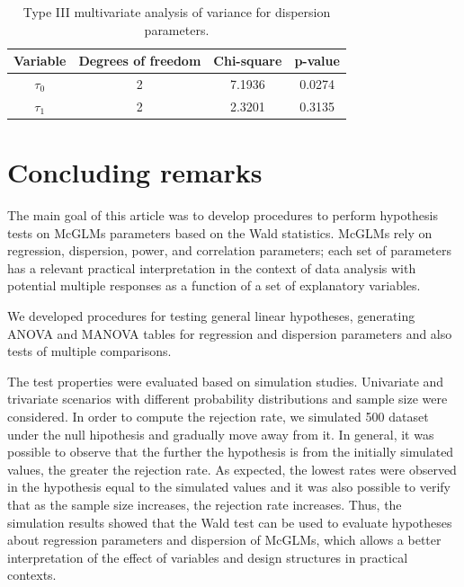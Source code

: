 \documentclass[Review,sagev,times, doublespace]{sagej}
\begin{document}
\begin{table}[h]
\centering
\begin{tabular}{cccc}
\hline
Variable               & Degrees of freedom & Chi-square & p-value        \\ \hline
$\tau_0$ & 2                  & 7.1936       & 0.0274  \\
$\tau_1$ & 2                  & 2.3201       & 0.3135         \\ \hline
\end{tabular}
\caption{Type III multivariate analysis of variance for dispersion parameters.}
\label{tab8}
\end{table}


\section{Concluding remarks}\label{sec7}

The main goal of this article was to develop procedures to perform hypothesis tests on McGLMs parameters based on the Wald statistics. McGLMs rely on regression, dispersion, power, and correlation parameters; each set of parameters has a relevant practical interpretation in the context of data analysis with potential multiple responses as a function of a set of explanatory variables.

We developed procedures for testing general linear hypotheses, generating ANOVA and MANOVA tables for regression and dispersion parameters and also tests of multiple comparisons.

The test properties were evaluated based on simulation studies. Univariate and trivariate scenarios with different probability distributions and sample size were considered.
In order to compute the rejection rate, we simulated 500 dataset under the null hipothesis and gradually move away from it. 
In general, it was possible to observe that the further the hypothesis is from the initially simulated values, the greater the rejection rate. 
As expected, the lowest rates were observed in the hypothesis equal to the simulated values and it was also possible to verify that as the sample size increases, 
the rejection rate increases. Thus, the simulation results showed that the Wald test can be used to evaluate hypotheses about regression parameters and dispersion of McGLMs, 
which allows a better interpretation of the effect of variables and design structures in practical contexts.
\end{document}
